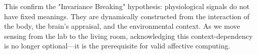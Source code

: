 \documentclass[journal]{IEEEtran}
\begin{document}
This confirm the "Invariance Breaking" hypothesis: physiological signals do not have fixed meanings. They are dynamically constructed from the interaction of the body, the brain's appraisal, and the environmental context. As we move sensing from the lab to the living room, acknowledging this context-dependency is no longer optional—it is the prerequisite for valid affective computing.



\end{document}
